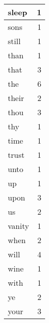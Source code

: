 \begin{center}
\begin{longtable}{l|r}
sleep & 1 \\ \hline
sons & 1 \\ \hline
still & 1 \\ \hline
than & 1 \\ \hline
that & 3 \\ \hline
the & 6 \\ \hline
their & 2 \\ \hline
thou & 3 \\ \hline
thy & 1 \\ \hline
time & 1 \\ \hline
trust & 1 \\ \hline
unto & 1 \\ \hline
up & 1 \\ \hline
upon & 3 \\ \hline
us & 2 \\ \hline
vanity & 1 \\ \hline
when & 2 \\ \hline
will & 4 \\ \hline
wine & 1 \\ \hline
with & 1 \\ \hline
ye & 2 \\ \hline
your & 3 \\ \hline
\end{longtable}
\end{center}



\normalsize



